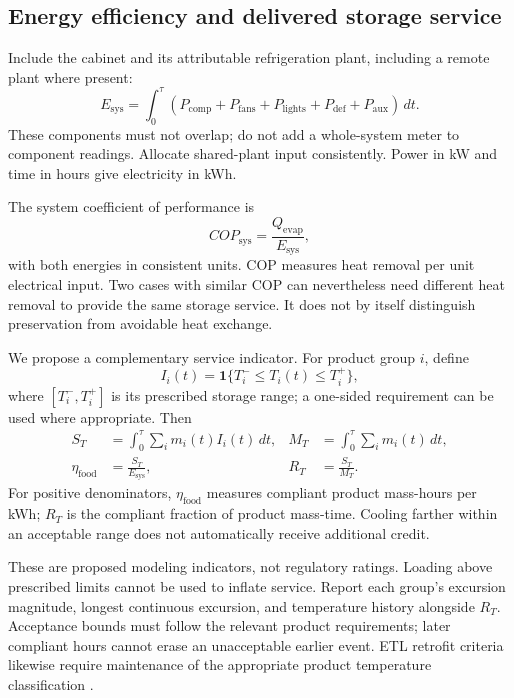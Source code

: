 \documentclass[12pt]{article}
\begin{document}
\subsection{Energy efficiency and delivered storage service}

Include the cabinet and its attributable refrigeration plant, including a remote plant where present:
\begin{equation}
E_{\mathrm{sys}}=\int_0^\tau
\left(P_{\mathrm{comp}}+P_{\mathrm{fans}}+P_{\mathrm{lights}}
+P_{\mathrm{def}}+P_{\mathrm{aux}}\right)\,dt.
\label{eq:energy}
\end{equation}
These components must not overlap; do not add a whole-system meter to component readings. Allocate shared-plant input consistently. Power in kW and time in hours give electricity in kWh.

The system coefficient of performance is
\begin{equation}
COP_{\mathrm{sys}}=\frac{Q_{\mathrm{evap}}}{E_{\mathrm{sys}}},
\end{equation}
with both energies in consistent units. COP measures heat removal per unit electrical input. Two cases with similar COP can nevertheless need different heat removal to provide the same storage service. It does not by itself distinguish preservation from avoidable heat exchange.

We propose a complementary service indicator. For product group $i$, define
\begin{equation}
I_i(t)=\mathbf{1}\{T_i^{-}\leq T_i(t)\leq T_i^{+}\},
\end{equation}
where $[T_i^{-},T_i^{+}]$ is its prescribed storage range; a one-sided requirement can be used where appropriate. Then
\begin{align}
S_T&=\int_0^\tau\sum_i m_i(t)I_i(t)\,dt,
&
M_T&=\int_0^\tau\sum_i m_i(t)\,dt,\\
\eta_{\mathrm{food}}&=\frac{S_T}{E_{\mathrm{sys}}},
&
R_T&=\frac{S_T}{M_T}.
\label{eq:service}
\end{align}
For positive denominators, $\eta_{\mathrm{food}}$ measures compliant product mass-hours per kWh; $R_T$ is the compliant fraction of product mass-time. Cooling farther within an acceptable range does not automatically receive additional credit.

These are proposed modeling indicators, not regulatory ratings. Loading above prescribed limits cannot be used to inflate service. Report each group's excursion magnitude, longest continuous excursion, and temperature history alongside $R_T$. Acceptance bounds must follow the relevant product requirements; later compliant hours cannot erase an unacceptable earlier event. ETL retrofit criteria likewise require maintenance of the appropriate product temperature classification \cite{etl}.
\end{document}
